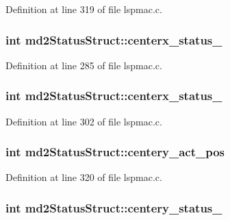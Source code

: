 Definition at line 319 of file lspmac.\-c.

\hypertarget{structmd2StatusStruct_aa619cdbd7a563408c6b825ddc4f74ebb}{
\subsubsection[{centerx\-\_\-status\-\_\-1}]{\setlength{\rightskip}{0pt plus 5cm}int md2\-Status\-Struct\-::centerx\-\_\-status\-\_}}\label{structmd2StatusStruct_aa619cdbd7a563408c6b825ddc4f74ebb}


Definition at line 285 of file lspmac.\-c.

\hypertarget{structmd2StatusStruct_ae4fad6debe138ed7815d463e83f8d0f6}{
\subsubsection[{centerx\-\_\-status\-\_\-2}]{\setlength{\rightskip}{0pt plus 5cm}int md2\-Status\-Struct\-::centerx\-\_\-status\-\_}}\label{structmd2StatusStruct_ae4fad6debe138ed7815d463e83f8d0f6}


Definition at line 302 of file lspmac.\-c.

\hypertarget{structmd2StatusStruct_a6be71a92a599d490ca808af8c7e7faa0}{
\subsubsection[{centery\-\_\-act\-\_\-pos}]{\setlength{\rightskip}{0pt plus 5cm}int md2\-Status\-Struct\-::centery\-\_\-act\-\_\-pos}}\label{structmd2StatusStruct_a6be71a92a599d490ca808af8c7e7faa0}


Definition at line 320 of file lspmac.\-c.

\hypertarget{structmd2StatusStruct_a57f65ebe28ef88f1c632d9f35d9167eb}{
\subsubsection[{centery\-\_\-status\-\_\-1}]{\setlength{\rightskip}{0pt plus 5cm}int md2\-Status\-Struct\-::centery\-\_\-status\-\_}}\label{structmd2StatusStruct_a57f65ebe28ef88f1c632d9f35d9167eb}


